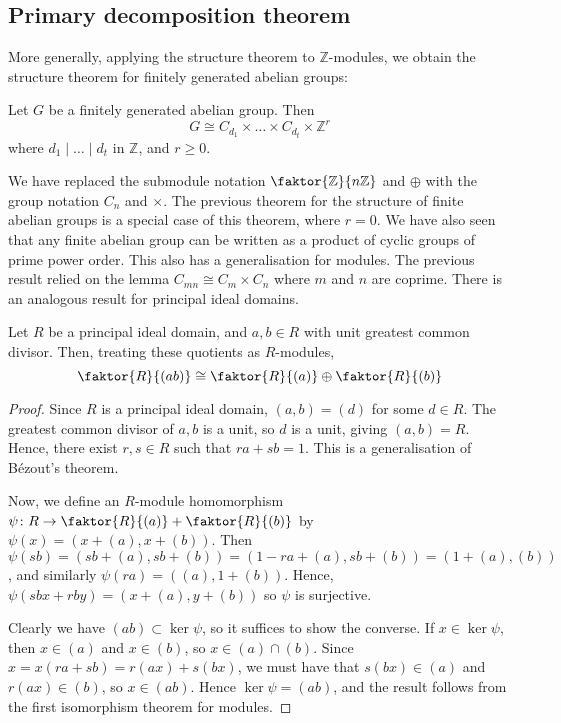 \subsection{Primary decomposition theorem}
More generally, applying the structure theorem to \( \mathbb Z \)-modules, we obtain the structure theorem for finitely generated abelian groups:
\begin{theorem}
	Let \( G \) be a finitely generated abelian group.
	Then
	\[
		G \cong C_{d_1} \times \dots \times C_{d_t} \times \mathbb Z^r
	\]
	where \( d_1 \mid \dots \mid d_t \) in \( \mathbb Z \), and \( r \geq 0 \).
\end{theorem}
We have replaced the submodule notation \( \faktor{\mathbb Z}{n\mathbb Z} \) and \( \oplus \) with the group notation \( C_n \) and \( \times \).
The previous theorem for the structure of finite abelian groups is a special case of this theorem, where \( r = 0 \).
We have also seen that any finite abelian group can be written as a product of cyclic groups of prime power order.
This also has a generalisation for modules.
The previous result relied on the lemma \( C_{mn} \cong C_m \times C_n \) where \( m \) and \( n \) are coprime.
There is an analogous result for principal ideal domains.
\begin{lemma}
	Let \( R \) be a principal ideal domain, and \( a, b \in R \) with unit greatest common divisor.
	Then, treating these quotients as \( R \)-modules,
	\[
		\faktor{R}{(ab)} \cong \faktor{R}{(a)} \oplus \faktor{R}{(b)}
	\]
\end{lemma}
\begin{proof}
	Since \( R \) is a principal ideal domain, \( (a,b) = (d) \) for some \( d \in R \).
	The greatest common divisor of \( a, b \) is a unit, so \( d \) is a unit, giving \( (a,b) = R \).
	Hence, there exist \( r,s \in R \) such that \( ra + sb = 1 \).
	This is a generalisation of B\'ezout's theorem.

	Now, we define an \( R \)-module homomorphism \( \psi \colon R \to \faktor{R}{(a)} + \faktor{R}{(b)} \) by \( \psi(x) = (x+(a), x+(b)) \).
	Then \( \psi(sb) = (sb+(a), sb+(b)) = (1-ra+(a),sb+(b)) = (1+(a), (b)) \), and similarly \( \psi(ra) = ((a),1+(b)) \).
	Hence, \( \psi(sbx + rby) = (x+(a),y+(b)) \) so \( \psi \) is surjective.

	Clearly we have \( (ab) \subset \ker \psi \), so it suffices to show the converse.
	If \( x \in \ker \psi \), then \( x \in (a) \) and \( x \in (b) \), so \( x \in (a) \cap (b) \).
	Since \( x = x(ra+sb) = r(ax) + s(bx) \), we must have that \( s(bx) \in (a) \) and \( r(ax) \in (b) \), so \( x \in (ab) \).
	Hence \( \ker \psi = (ab) \), and the result follows from the first isomorphism theorem for modules.
\end{proof}
